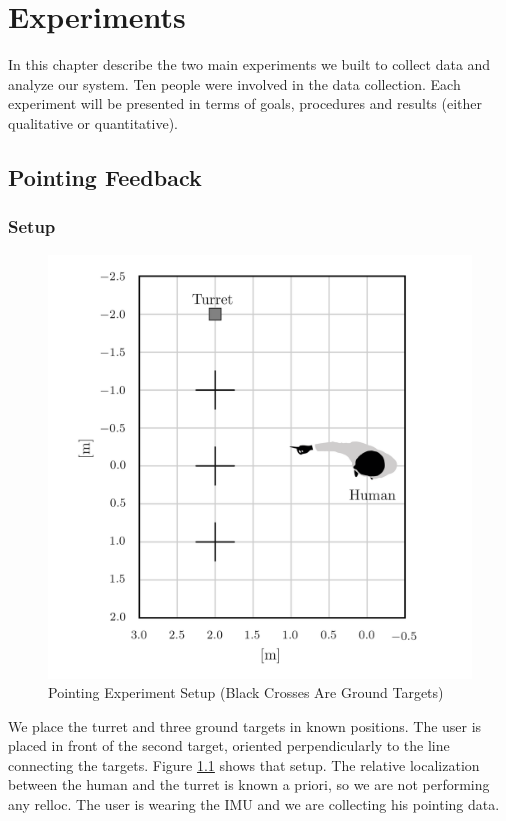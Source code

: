 \chapter{Experiments}
In this chapter describe the two main experiments we built to collect data and analyze our system. Ten people were involved in the data collection. Each experiment will be presented in terms of goals, procedures and results (either qualitative or quantitative).
\section{Pointing Feedback}
\subsection{Setup}
\begin{figure}
	\centering
	\includegraphics[width=\textwidth]{img/pointingExpSetup.png}%
	\caption{Pointing Experiment Setup (Black Crosses Are Ground Targets)}
	\label{fig:pointingExpSetup}
\end{figure}
We place the turret and three ground targets in known positions. The user is placed in front of the second target, oriented perpendicularly to the line connecting the targets. Figure \ref{fig:pointingExpSetup} shows that setup. The relative localization between the human and the turret is known a priori, so we are not performing any relloc. The user is wearing the IMU and we are collecting his pointing data.\\
